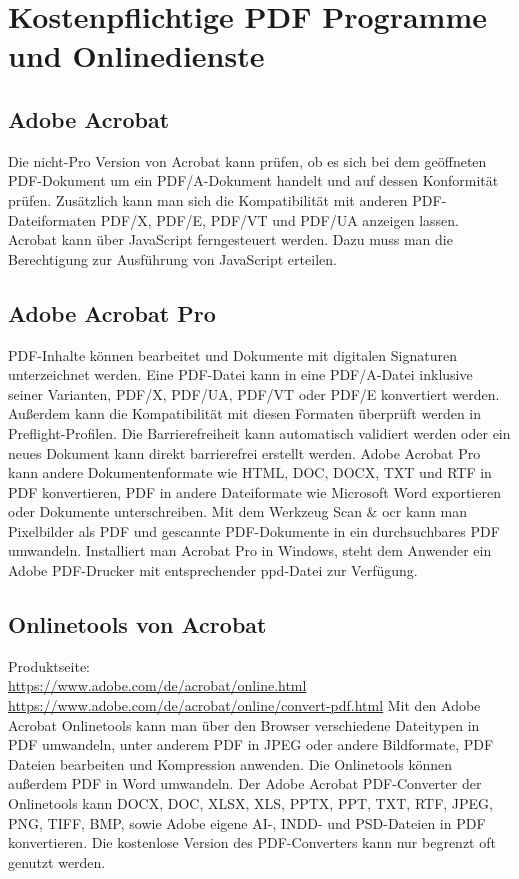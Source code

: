 \section{Kostenpflichtige PDF Programme und Onlinedienste}

\subsection{Adobe Acrobat}
Die nicht-Pro Version von Acrobat kann prüfen, ob es sich bei dem geöffneten PDF-Dokument um ein PDF/A-Dokument handelt und auf dessen Konformität prüfen. Zusätzlich kann man sich die Kompatibilität mit anderen PDF-Dateiformaten PDF/X, PDF/E, PDF/VT und PDF/UA anzeigen lassen. \cite{adobe-pdf-a} Acrobat kann über JavaScript ferngesteuert werden. Dazu muss man die Berechtigung zur Ausführung von JavaScript erteilen. \cite{schneeberger}

\subsection{Adobe Acrobat Pro}
PDF-Inhalte können bearbeitet und Dokumente mit digitalen Signaturen unterzeichnet werden. \cite{adobe-search}
Eine PDF-Datei kann in eine PDF/A-Datei inklusive seiner Varianten, PDF/X, PDF/UA, PDF/VT oder PDF/E konvertiert werden. Außerdem kann die Kompatibilität mit diesen Formaten überprüft werden in Preflight-Profilen. \cite{adobe-pdf-a} Die Barrierefreiheit kann automatisch validiert werden oder ein neues Dokument kann direkt barrierefrei erstellt werden.
Adobe Acrobat Pro kann andere Dokumentenformate wie HTML, DOC, DOCX, TXT und RTF in PDF konvertieren, PDF in andere Dateiformate wie Microsoft Word exportieren oder Dokumente unterschreiben. \cite{adobe-formate} 
Mit dem Werkzeug Scan \& \gls{ocr} kann man Pixelbilder als PDF und gescannte PDF-Dokumente in ein durchsuchbares PDF umwandeln. \cite{adobe-search}
Installiert man Acrobat Pro in Windows, steht dem Anwender ein Adobe PDF-Drucker mit entsprechender \gls{ppd}-Datei zur Verfügung. \cite{schneeberger}

\subsection{Onlinetools von Acrobat}
Produktseite: \\
\url{https://www.adobe.com/de/acrobat/online.html} \\
\url{https://www.adobe.com/de/acrobat/online/convert-pdf.html}
Mit den Adobe Acrobat Onlinetools kann man über den Browser verschiedene Dateitypen in PDF umwandeln, unter anderem PDF in JPEG oder andere Bildformate, PDF Dateien bearbeiten und Kompression anwenden. Die Onlinetools können außerdem PDF in Word umwandeln. \cite{adobe-search}
Der Adobe Acrobat PDF-Converter der Onlinetools kann DOCX, DOC, XLSX, XLS, PPTX, PPT, TXT, RTF, JPEG, PNG, TIFF, BMP, sowie Adobe eigene AI-, INDD- und PSD-Dateien in PDF konvertieren. \cite{adobe-formate} Die kostenlose Version des PDF-Converters kann nur begrenzt oft genutzt werden.

